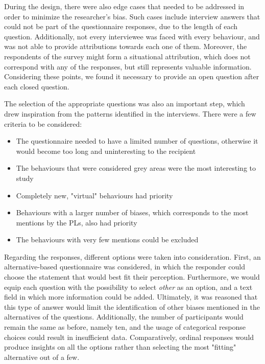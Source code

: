 During the design, there were also edge cases that needed to be addressed in order to minimize the researcher's bias. Such cases include interview answers that could not be part of the questionnaire responses, due to the length of each question. Additionally, not every interviewee was faced with every behaviour, and was not able to provide attributions towards each one of them. Moreover, the respondents of the survey might form a situational attribution, which does not correspond with any of the responses, but still represents valuable information. Considering these points, we found it necessary to provide an open question after each closed question. 

The selection of the appropriate questions was also an important step, which drew inspiration from the patterns identified in the interviews. There were a few criteria to be considered: 
\begin{itemize}
    \item The questionnaire needed to have a limited number of questions, otherwise it would become too long and uninteresting to the recipient 
    \item The behaviours that were considered grey areas were the most interesting to study
    \item Completely new, "virtual" behaviours had priority
    \item Behaviours with a larger number of biases, which corresponds to the most mentions by the PLs, also had priority
    \item The behaviours with very few mentions could be excluded
\end{itemize}

Regarding the responses, different options were taken into consideration. First, an alternative-based questionnaire was considered, in which the responder could choose the statement that would best fit their perception. Furthermore, we would equip each question with the possibility to select \textit{other} as an option, and a text field in which more information could be added. Ultimately, it was reasoned that this type of answer would limit the identification of other biases mentioned in the alternatives of the questions. Additionally, the number of participants would remain the same as before, namely ten, and the usage of categorical response choices could result in insufficient data. Comparatively, ordinal responses would produce insights on all the options rather than selecting the most "fitting" alternative out of a few. 

